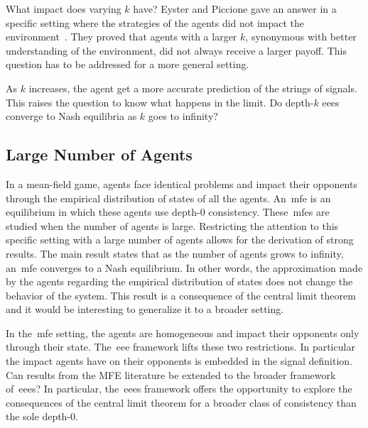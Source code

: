 What impact does varying \(k\) have?
Eyster and Piccione gave an answer in a specific setting where the strategies of the agents did not impact the environment~\cite{eyster_piccione:2011}.
They proved that agents with a larger \(k\), synonymous with better understanding of the environment, did not always receive a larger payoff.
This question has to be addressed for a more general setting.

As \(k\) increases, the agent get a more accurate prediction of the strings of signals.
This raises the question to know what happens in the limit.
Do depth-\(k\) \acp{eee} converge to Nash equilibria as \(k\) goes to infinity?

\subsection{Large Number of Agents}
In a mean-field game, agents face identical problems and impact their opponents through the empirical distribution of states of all the agents.
An~\ac{mfe} is an equilibrium in which these agents use depth-\(0\) consistency.
These~\acp{mfe} are studied when the number of agents is large.
Restricting the attention to this specific setting with a large number of agents allows for the derivation of strong results.
The main result states that as the number of agents grows to infinity, an~\ac{mfe} converges to a Nash equilibrium.
In other words, the approximation made by the agents regarding the empirical distribution of states does not change the behavior of the system.
This result is a consequence of the central limit theorem and it would be interesting to generalize it to a broader setting.

In the~\ac{mfe} setting, the agents are homogeneous and impact their opponents only through their state.
The~\ac{eee} framework lifts these two restrictions.
In particular the impact agents have on their opponents is embedded in the signal definition.
Can results from the MFE literature be extended to the broader framework of~\acp{eee}?
In particular, the~\acp{eee} framework offers the opportunity to explore the consequences of the central limit theorem for a broader class of consistency than the sole depth-\(0\).

